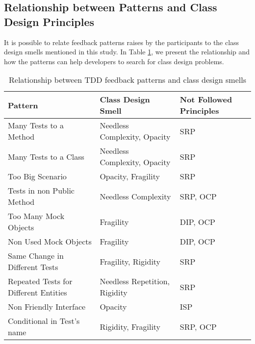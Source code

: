 \documentclass[times]{speauth}
\begin{document}
\subsection{Relationship between Patterns and Class Design Principles}

It is possible to relate feedback patterns raises by the participants to the class design
smells mentioned in this study.
In Table \ref{tab:relacao-padroes}, we present the relationship and how the patterns
can help developers to search for class design problems.

\begin{table}[h!]
	\centering
	\begin{tabular}{| p{4.5cm} | p{4.5cm} | p{3cm} | }
		\hline

		\textbf{Pattern} & \textbf{Class Design Smell} & \textbf{Not Followed Principles}\\
		
		\hline

		Many Tests to a Method                   & Needless Complexity, Opacity   & SRP \\ \hline
		Many Tests to a Class                  & Needless Complexity, Opacity   & SRP \\ \hline
		Too Big Scenario                           & Opacity, Fragility                  & SRP \\ \hline
		Tests in non Public Method             & Needless Complexity              & SRP, OCP \\ \hline
		Too Many Mock Objects                       & Fragility                             & DIP, OCP \\ \hline
		Non Used Mock Objects                  & Fragility                             & DIP, OCP \\ \hline
		Same Change in Different Tests           & Fragility, Rigidity                    & SRP \\ \hline
		Repeated Tests for Different Entities     & Needless Repetition, Rigidity        & SRP  \\ \hline
		Non Friendly Interface                         & Opacity                               & ISP \\ \hline
		Conditional in Test's name                   & Rigidity, Fragility                    & SRP, OCP \\

		\hline
		
	\end{tabular}
	\caption{Relationship between TDD feedback patterns and class design smells}
	\label{tab:relacao-padroes}
\end{table}
\end{document}
